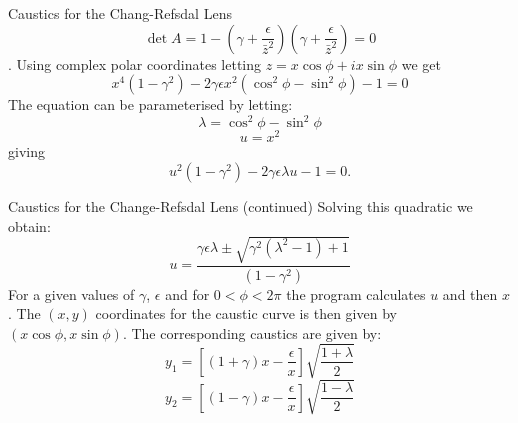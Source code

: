\documentclass[aspectratio=1610,xcolor=dvipsnames,t]{beamer}
\begin{document}

\begin{frame}{Caustics for the Chang-Refsdal Lens} 
    \begin{equation}
        \det A = 1 - \left( \gamma + \frac{\epsilon}{\bar{z}^2} \right)
                     \left( \gamma + \frac{\epsilon}{\bar{z}^2} \right) = 0
    \end{equation}.
    Using complex polar coordinates letting $z = x \cos \phi + ix \sin \phi$
    we get
    \begin{equation}
        x^4 (1 - \gamma^2) - 2 \gamma \epsilon x^2 
            (\cos^2\phi - \sin^2\phi) - 1 = 0
    \end{equation}
    The equation can be parameterised by letting:
        \[ \lambda = \cos^2\phi - \sin^2\phi \]
        \[ u = x^2 \]
    giving
    \begin{equation}
        u^2(1 - \gamma^2) - 2\gamma \epsilon \lambda u - 1 = 0.
    \end{equation}
\end{frame} 

\begin{frame}{Caustics for the Change-Refsdal Lens (continued)} 
    Solving this quadratic we obtain:
    \begin{equation}
        u = \frac{\gamma\epsilon\lambda \pm \sqrt{\gamma^2(\lambda^2 - 1) + 1}}
                 {(1 - \gamma^2)}
    \end{equation}
    For a given values of $\gamma$, $\epsilon$ and for $0 < \phi < 2\pi$
    the program calculates $u$ and then $x$. The $(x,y)$ coordinates
    for the caustic curve is then given by $(x\cos\phi, x\sin\phi)$.
    The corresponding caustics are given by:
    \begin{equation}
        y_1 = \left[ (1 + \gamma)x - \frac{\epsilon}{x} \right] 
              \sqrt{\frac{1 + \lambda}{2} } 
    \end{equation}
    \begin{equation}
       y_2 = \left[ (1 - \gamma)x - \frac{\epsilon}{x} \right] 
                     \sqrt{\frac{1 - \lambda}{2} }
    \end{equation}
\end{frame} 
\end{document}
